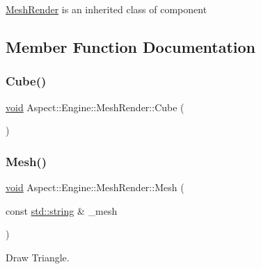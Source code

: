 \mbox{\hyperlink{class_aspect_1_1_engine_1_1_mesh_render}{Mesh\+Render}} is an inherited class of component 

\subsection{Member Function Documentation}
\mbox{\label{class_aspect_1_1_engine_1_1_mesh_render_a31478e2366177bf2e3c98fe71c769c33}} 
\subsubsection{\texorpdfstring{Cube()}{Cube()}}
{\footnotesize\ttfamily \mbox{\hyperlink{_s_d_l__opengles2__gl2ext_8h_ae5d8fa23ad07c48bb609509eae494c95}{void}} Aspect\+::\+Engine\+::\+Mesh\+Render\+::\+Cube (\begin{DoxyParamCaption}{ }\end{DoxyParamCaption})}

\mbox{\label{class_aspect_1_1_engine_1_1_mesh_render_a16ef5a49a05bd542a33a78e67b4e3067}} 
\subsubsection{\texorpdfstring{Mesh()}{Mesh()}}
{\footnotesize\ttfamily \mbox{\hyperlink{_s_d_l__opengles2__gl2ext_8h_ae5d8fa23ad07c48bb609509eae494c95}{void}} Aspect\+::\+Engine\+::\+Mesh\+Render\+::\+Mesh (\begin{DoxyParamCaption}\item[{const \mbox{\hyperlink{_s_d_l__opengl__glext_8h_ae84541b4f3d8e1ea24ec0f466a8c568b}{std\+::string}} \&}]{\+\_\+mesh }\end{DoxyParamCaption})}



Draw Triangle. 

\mbox{\label{class_aspect_1_1_engine_1_1_mesh_render_aebaa5a60d373d3363a13336cfbaa4141}} 
